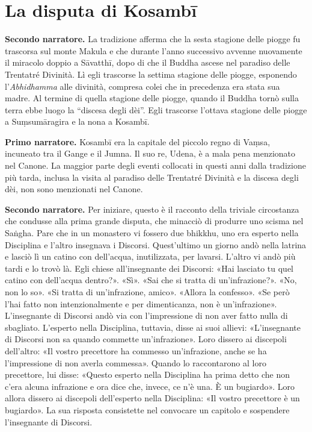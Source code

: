 \chapter{La disputa di Kosambī}

\textbf{Secondo narratore.}  La tradizione afferma che la sesta stagione delle
piogge fu trascorsa sul monte Makula e che durante l’anno successivo
avvenne nuovamente il miracolo doppio a Sāvatthī, dopo di che il Buddha
ascese nel paradiso delle Trentatré Divinità. Lì egli trascorse la
settima stagione delle piogge, esponendo l’\emph{Abhidhamma} alle divinità,
compresa colei che in precedenza era stata sua madre. Al termine di
quella stagione delle piogge, quando il Buddha tornò sulla terra ebbe
luogo la “discesa degli dèi”. Egli trascorse l’ottava stagione delle
piogge a Suṃsumāragira e la nona a Kosambī.


\textbf{Primo narratore.} Kosambī era la capitale del piccolo regno di Vaṃsa,
incuneato tra il Gange e il Jumna. Il suo re, Udena, è a mala pena
menzionato nel Canone. La maggior parte degli eventi collocati in questi
anni dalla tradizione più tarda, inclusa la visita al paradiso delle
Trentatré Divinità e la discesa degli dèi, non sono menzionati nel
Canone.


\textbf{Secondo narratore.} Per iniziare, questo è il racconto della triviale
circostanza che condusse alla prima grande disputa, che minacciò di
produrre uno scisma nel Saṅgha. Pare che in un monastero vi fossero due
bhikkhu, uno era esperto nella Disciplina e l’altro insegnava i
Discorsi. Quest’ultimo un giorno andò nella latrina e lasciò lì un
catino con dell’acqua, inutilizzata, per lavarsi. L’altro vi andò più
tardi e lo trovò là. Egli chiese all’insegnante dei Discorsi: «Hai
lasciato tu quel catino con dell’acqua dentro?». «Sì». «Sai che si
tratta di un’infrazione?». «No, non lo so». «Si tratta di un’infrazione,
amico». «Allora la confesso». «Se però l’hai fatto non intenzionalmente
e per dimenticanza, non è un’infrazione». L’insegnante di Discorsi andò
via con l’impressione di non aver fatto nulla di sbagliato. L’esperto
nella Disciplina, tuttavia, disse ai suoi allievi: «L’insegnante di
Discorsi non sa quando commette un’infrazione». Loro dissero ai
discepoli dell’altro: «Il vostro precettore ha commesso un’infrazione,
anche se ha l’impressione di non averla commessa». Quando lo
raccontarono al loro precettore, lui disse: «Questo esperto nella
Disciplina ha prima detto che non c’era alcuna infrazione e ora dice
che, invece, ce n’è una. È un bugiardo». Loro allora dissero ai
discepoli dell’esperto nella Disciplina: «Il vostro precettore è un
bugiardo». La sua risposta consistette nel convocare un capitolo e
sospendere l’insegnante di Discorsi.


